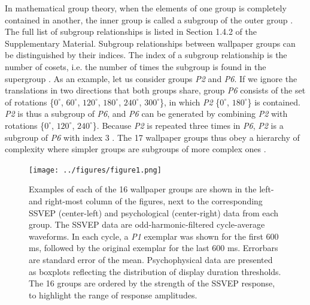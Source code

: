 \documentclass[11pt, twoside]{article}
\begin{document}
In mathematical group theory, when the elements of one group is completely contained in another, the inner group is called a subgroup of the outer group \citep{RN1425}. The full list of subgroup relationships is listed in Section 1.4.2 of the Supplementary Material. Subgroup relationships between wallpaper groups can be distinguished by their indices. The index of a subgroup relationship is the number of cosets, i.e. the number of times the subgroup is found in the supergroup \citep{RN1425}. As an example, let us consider groups \textit{P2} and \textit{P6}. If we ignore the translations in two directions that both groups share, group \textit{P6} consists of the set of rotations \{$0^{\circ}$, $60^{\circ}$, $120^{\circ}$, $180^{\circ}$, $240^{\circ}$, $300^{\circ}$\}, in which \textit{P2} \{$0^{\circ}$, $180^{\circ}$\} is contained. \textit{P2} is thus a subgroup of \textit{P6}, and \textit{P6} can be generated by combining \textit{P2} with rotations \{$0^{\circ}$, $120^{\circ}$, $240^{\circ}$\}. Because \textit{P2} is repeated three times in \textit{P6}, \textit{P2} is a subgroup of \textit{P6} with index 3 \citep{RN1425}. The 17 wallpaper groups thus obey a hierarchy of complexity where simpler groups are subgroups of more complex ones \citep{RN1711}. 



\begin{figure}[hp]
\centering
\texttt{[image: ../figures/figure1.png]}
\caption{Examples of each of the 16 wallpaper groups are shown in the left- and right-most column of the figures, next to the corresponding SSVEP (center-left) and psychological (center-right) data from each group. The SSVEP data are odd-harmonic-filtered cycle-average waveforms. In each cycle, a \textit{P1} exemplar was shown for the first 600 ms, followed by the original exemplar for the last 600 ms. Errorbars are standard error of the mean. Psychophysical data are presented as boxplots reflecting the distribution of display duration thresholds. The 16 groups are ordered by the strength of the SSVEP response, to highlight the range of response amplitudes.}
\label{fig:example_stimuli}
\end{figure}
\end{document}
